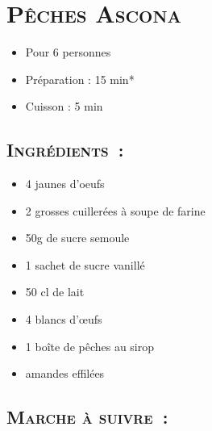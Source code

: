 \section[\normalsize{P\^eches Ascona}]{\LARGE{\textsc{P\^eches Ascona}}}		%


\begin{itemize}
\item Pour 6 personnes
\item Préparation : 15 min*
\item Cuisson : 5 min
\end{itemize}

\subsection*{\textsc{Ingr\'edients~:}}

\begin{itemize}
\item 4 jaunes d’oeufs
\item 2 grosses cuiller\'ees \`a soupe de farine
\item 50g de sucre semoule 
\item 1 sachet de sucre vanill\'e
\item 50 cl de lait
\item 4 blancs d’œufs
\item 1 boîte de p\^eches au sirop
\item amandes effil\'ees
\end{itemize}


\subsection*{\textsc{Marche \`a suivre~:}}

